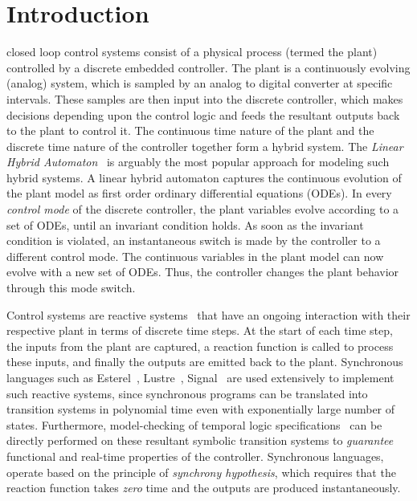 \documentclass[10pt,journal,cspaper,compsoc]{IEEEtran}
\begin{document}
\section{Introduction}







 closed loop control systems consist of a
physical process (termed the plant) controlled by a discrete embedded
controller. The plant is a continuously evolving (analog) system, which
is sampled by an analog to digital converter at specific
intervals. These samples are then input into the discrete controller,
which makes decisions depending upon the control logic and feeds the
resultant outputs back to the plant to control it.  The continuous time
nature of the plant and the discrete time nature of the controller
together form a hybrid system.  The \textit{Linear Hybrid
  Automaton}~\cite{Henzinger:1996:THA:788018.788803} is arguably the
most popular approach for modeling such hybrid systems. A linear hybrid
automaton captures the continuous evolution of the plant model as first
order ordinary differential equations (ODEs). In every \textit{control
  mode} of the discrete controller, the plant variables evolve according
to a set of ODEs, until an invariant condition holds. As soon as the
invariant condition is violated, an instantaneous switch is made by the
controller to a different control mode. The continuous variables in the
plant model can now evolve with a new set of ODEs. Thus, the controller
changes the plant behavior through this mode switch.

Control systems are reactive systems~\cite{Harel:1987:SVF:34884.34886}
that have an ongoing interaction with their respective plant in terms of
discrete time steps. At the start of each time step, the inputs from the
plant are captured, a reaction function is called to process these
inputs, and finally the outputs are emitted back to the
plant. Synchronous languages such as Esterel~\cite{berry96},
Lustre~\cite{nhal91}, Signal~\cite{pgue91} are used extensively to
implement such reactive systems, since synchronous programs can be
translated into transition systems in polynomial time even with
exponentially large number of states. Furthermore, model-checking of
temporal logic specifications~\cite{clarke-book00} can be directly
performed on these resultant symbolic transition systems to
\textit{guarantee} functional and real-time properties of the
controller. Synchronous languages, operate based on the principle of
\textit{synchrony hypothesis}, which requires that the reaction function
takes \textit{zero} time and the outputs are produced instantaneously.
\end{document}

